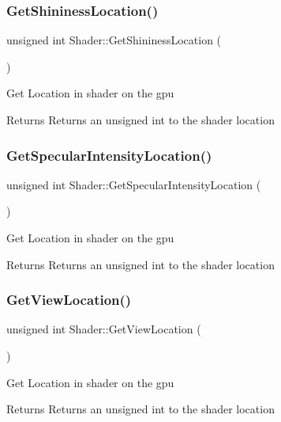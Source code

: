\subsubsection{\texorpdfstring{GetShininessLocation()}{GetShininessLocation()}}
{\footnotesize\ttfamily unsigned int Shader\+::\+Get\+Shininess\+Location (\begin{DoxyParamCaption}{ }\end{DoxyParamCaption})}

Get Location in shader on the gpu \begin{DoxyReturn}{Returns}
Returns an unsigned int to the shader location 
\end{DoxyReturn}
\mbox{\label{class_shader_af1fcfdae96f797a6c8a278aeebbbacf8}} 
\subsubsection{\texorpdfstring{GetSpecularIntensityLocation()}{GetSpecularIntensityLocation()}}
{\footnotesize\ttfamily unsigned int Shader\+::\+Get\+Specular\+Intensity\+Location (\begin{DoxyParamCaption}{ }\end{DoxyParamCaption})}

Get Location in shader on the gpu \begin{DoxyReturn}{Returns}
Returns an unsigned int to the shader location 
\end{DoxyReturn}
\mbox{\label{class_shader_a8950f9df8d8fd0357c129e1dca74be24}} 
\subsubsection{\texorpdfstring{GetViewLocation()}{GetViewLocation()}}
{\footnotesize\ttfamily unsigned int Shader\+::\+Get\+View\+Location (\begin{DoxyParamCaption}{ }\end{DoxyParamCaption})}

Get Location in shader on the gpu \begin{DoxyReturn}{Returns}
Returns an unsigned int to the shader location 
\end{DoxyReturn}
\mbox{\label{class_shader_acca9db816d6d9587bef5689317aea69e}} 
